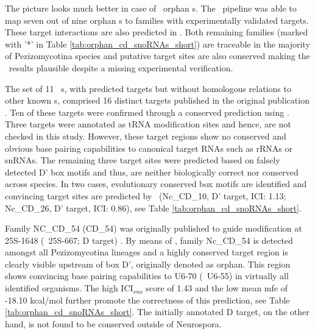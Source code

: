 The picture looks much better in case of \afu\ orphan \sno s. The
\snostrip\ pipeline was able to map seven out of nine orphan \cd s to
families with experimentally validated targets. These target
interactions are also predicted in \afu. Both remaining families
(marked with '*' in Table \ref{tab:orphan_cd_snoRNAs_short}) are
traceable in the majority of Pezizomycotina species and putative
target sites are also conserved making the \snostrip\ results
plausible despite a missing experimental verification.

The set of 11 \ncr\ \sno s, with predicted targets but without
homologous relations to other known \sno s, comprised 16 distinct
targets published in the original publication \cite{Li:2005}.  Ten of
these targets were confirmed through a conserved prediction using
\snostrip.  Three targets were annotated as tRNA modification sites
and hence, are not checked in this study. However, these target
regions show no conserved and obvious base pairing capabilities to
canonical target RNAs such as rRNAs or snRNAs. The remaining three
target sites were predicted based on falsely detected D' box motifs
and thus, are neither biologically correct nor conserved across
species. In two cases, evolutionary conserved box motifs are
identified and convincing target sites are predicted by \snostrip\
(Nc\_CD\_10, D' target, ICI: 1.13; Nc\_CD\_26, D' target, ICI: 0.86),
see Table \ref{tab:orphan_cd_snoRNAs_short}.

Family NC\_CD\_54 (CD\_54) was originally published to guide
modification at 25S-1648 (\ncr\ 25S-667; D target) \cite{Liu:2009}. By
means of \snostrip, family Nc\_CD\_54 is detected amongst all
Pezizomycotina lineages and a highly conserved target region is
clearly visible upstream of box D', originally denoted as orphan. This
region shows convincing base pairing capabilities to U6-70 (\ncr\
U6-55) in virtually all identified organisms. The high ICI$_{sno}$
score of 1.43 and the low mean mfe of -18.10 kcal/mol further promote
the correctness of this prediction, see Table
\ref{tab:orphan_cd_snoRNAs_short}. The initially
annotated D target, on the other hand, is not found to be conserved outside of Neurospora.

